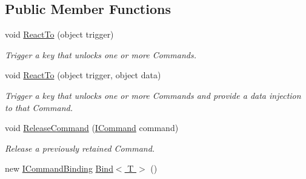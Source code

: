 \subsection*{Public Member Functions}
\begin{DoxyCompactItemize}
\item 
\hypertarget{interfacestrange_1_1extensions_1_1command_1_1api_1_1_i_command_binder_a1703954ba61a4468ef7189cbe6263e85}{void \hyperlink{interfacestrange_1_1extensions_1_1command_1_1api_1_1_i_command_binder_a1703954ba61a4468ef7189cbe6263e85}{React\-To} (object trigger)}\label{interfacestrange_1_1extensions_1_1command_1_1api_1_1_i_command_binder_a1703954ba61a4468ef7189cbe6263e85}

\begin{DoxyCompactList}\small\item\em Trigger a key that unlocks one or more Commands. \end{DoxyCompactList}\item 
\hypertarget{interfacestrange_1_1extensions_1_1command_1_1api_1_1_i_command_binder_aa409f9906be371e9818e30012091b67c}{void \hyperlink{interfacestrange_1_1extensions_1_1command_1_1api_1_1_i_command_binder_aa409f9906be371e9818e30012091b67c}{React\-To} (object trigger, object data)}\label{interfacestrange_1_1extensions_1_1command_1_1api_1_1_i_command_binder_aa409f9906be371e9818e30012091b67c}

\begin{DoxyCompactList}\small\item\em Trigger a key that unlocks one or more Commands and provide a data injection to that Command. \end{DoxyCompactList}\item 
void \hyperlink{interfacestrange_1_1extensions_1_1command_1_1api_1_1_i_command_binder_ae063357e7694fe0e107a53cc77e8e112}{Release\-Command} (\hyperlink{interfacestrange_1_1extensions_1_1command_1_1api_1_1_i_command}{I\-Command} command)
\begin{DoxyCompactList}\small\item\em Release a previously retained Command. \end{DoxyCompactList}\item 
\hypertarget{interfacestrange_1_1extensions_1_1command_1_1api_1_1_i_command_binder_a325a3e15e4a1efb6b35d624c2f940063}{new \hyperlink{interfacestrange_1_1extensions_1_1command_1_1api_1_1_i_command_binding}{I\-Command\-Binding} \hyperlink{interfacestrange_1_1extensions_1_1command_1_1api_1_1_i_command_binder_a325a3e15e4a1efb6b35d624c2f940063}{Bind$<$ T $>$} ()}\label{interfacestrange_1_1extensions_1_1command_1_1api_1_1_i_command_binder_a325a3e15e4a1efb6b35d624c2f940063}


\end{DoxyCompactItemize}
